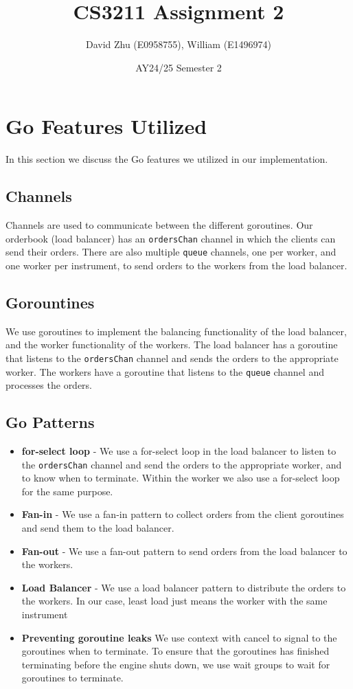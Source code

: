 \documentclass[11pt]{article}
\title{CS3211 Assignment 2}
\author{David Zhu (E0958755), William (E1496974)}
\date{AY24/25 Semester 2}
\begin{document}
\maketitle

\section{Go Features Utilized}

In this section we discuss the Go features we utilized in our implementation.

\subsection{Channels}

Channels are used to communicate between the different goroutines. Our orderbook (load balancer) has
an \texttt{ordersChan} channel in which the clients can send their orders.
There are also multiple \texttt{queue} channels, one per worker, and one worker per instrument, to send orders to the workers from the load balancer.

\subsection{Gorountines}

We use goroutines to implement the balancing functionality of the load balancer, and the worker functionality of the workers.
The load balancer has a goroutine that listens to the \texttt{ordersChan} channel and sends the orders to the appropriate worker.
The workers have a goroutine that listens to the \texttt{queue} channel and processes the orders.

\subsection{Go Patterns}

\begin{itemize}

\item \textbf{for-select loop} - We use a for-select loop in the load balancer to listen to the
    \texttt{ordersChan} channel and send the orders to the appropriate worker, and to know when to
    terminate. Within the worker we also use a for-select loop for the same purpose.
\item \textbf{Fan-in} - We use a fan-in pattern to collect orders from the client goroutines and send them to the load balancer.
\item \textbf{Fan-out} - We use a fan-out pattern to send orders from the load balancer to the workers.
\item \textbf{Load Balancer} - We use a load balancer pattern to distribute the orders to the workers. In our case, least load just means the worker with the same instrument
\item \textbf{Preventing goroutine leaks} We use context with cancel to signal to the goroutines when to
    terminate. To ensure that the goroutines has finished terminating before the engine shuts down,
    we use wait groups to wait for goroutines to terminate.

\end{itemize}
\end{document}
